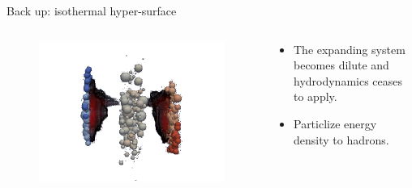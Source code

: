 \documentclass[11pt]{beamer}
\begin{document}
\begin{frame}[noframenumbering]{Back up: isothermal hyper-surface}
\begin{columns}[onlytextwidth]
  \begin{column}{0.2\textwidth}
    \begin{figure}
   	\begin{center}
   	\includegraphics[width=\textwidth]{pics/new230.png}
	\end{center} 	
  	\end{figure}
  \end{column}
  \begin{column}{0.8\textwidth}
  \begin{itemize}
  	\item The expanding system becomes dilute and hydrodynamics ceases to apply.
  	\item Particlize energy density to hadrons.
  \end{itemize}
  \end{column}
\end{columns}


\end{frame}
\end{document}
